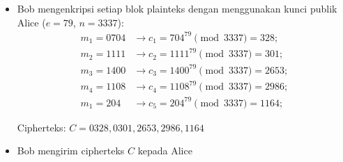 \documentclass{article}
\begin{document}

\begin{flushright}
\end{flushright}

\begin{itemize}
    \item Bob mengenkripsi setiap blok plainteks dengan menggunakan kunci publik Alice ($e = 79$, $n = 3337$):
    \begin{align*}
        m_1 = 0704 & \to c_1 = 704^{79} \pmod{3337} = 328; \\
        m_2 = 1111 & \to c_2 = 1111^{79} \pmod{3337} = 301; \\
        m_3 = 1400 & \to c_3 = 1400^{79} \pmod{3337} = 2653; \\
        m_4 = 1108 & \to c_4 = 1108^{79} \pmod{3337} = 2986; \\
        m_1 = 204 & \to c_5 = 204^{79} \pmod{3337} = 1164;
    \end{align*}

    Cipherteks: $C = 0328, 0301, 2653, 2986, 1164$

    \item Bob mengirim cipherteks $C$ kepada Alice
\end{itemize}
\end{document}
